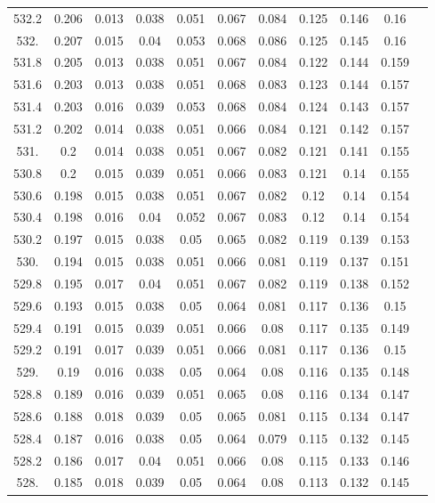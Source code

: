 \documentclass[12pt]{ctexart}
\numberwithin{equation}{section}
\begin{document}
\begin{longtable}{ccccccccccc}
532.2	&	0.206	&	0.013	&	0.038	&	0.051	&	0.067	&	0.084	&	0.125	&	0.146	&	0.16	\\
532.	&	0.207	&	0.015	&	0.04	&	0.053	&	0.068	&	0.086	&	0.125	&	0.145	&	0.16	\\
531.8	&	0.205	&	0.013	&	0.038	&	0.051	&	0.067	&	0.084	&	0.122	&	0.144	&	0.159	\\
531.6	&	0.203	&	0.013	&	0.038	&	0.051	&	0.068	&	0.083	&	0.123	&	0.144	&	0.157	\\
531.4	&	0.203	&	0.016	&	0.039	&	0.053	&	0.068	&	0.084	&	0.124	&	0.143	&	0.157	\\
531.2	&	0.202	&	0.014	&	0.038	&	0.051	&	0.066	&	0.084	&	0.121	&	0.142	&	0.157	\\
531.	&	0.2	&	0.014	&	0.038	&	0.051	&	0.067	&	0.082	&	0.121	&	0.141	&	0.155	\\
530.8	&	0.2	&	0.015	&	0.039	&	0.051	&	0.066	&	0.083	&	0.121	&	0.14	&	0.155	\\
530.6	&	0.198	&	0.015	&	0.038	&	0.051	&	0.067	&	0.082	&	0.12	&	0.14	&	0.154	\\
530.4	&	0.198	&	0.016	&	0.04	&	0.052	&	0.067	&	0.083	&	0.12	&	0.14	&	0.154	\\
530.2	&	0.197	&	0.015	&	0.038	&	0.05	&	0.065	&	0.082	&	0.119	&	0.139	&	0.153	\\
530.	&	0.194	&	0.015	&	0.038	&	0.051	&	0.066	&	0.081	&	0.119	&	0.137	&	0.151	\\
529.8	&	0.195	&	0.017	&	0.04	&	0.051	&	0.067	&	0.082	&	0.119	&	0.138	&	0.152	\\
529.6	&	0.193	&	0.015	&	0.038	&	0.05	&	0.064	&	0.081	&	0.117	&	0.136	&	0.15	\\
529.4	&	0.191	&	0.015	&	0.039	&	0.051	&	0.066	&	0.08	&	0.117	&	0.135	&	0.149	\\
529.2	&	0.191	&	0.017	&	0.039	&	0.051	&	0.066	&	0.081	&	0.117	&	0.136	&	0.15	\\
529.	&	0.19	&	0.016	&	0.038	&	0.05	&	0.064	&	0.08	&	0.116	&	0.135	&	0.148	\\
528.8	&	0.189	&	0.016	&	0.039	&	0.051	&	0.065	&	0.08	&	0.116	&	0.134	&	0.147	\\
528.6	&	0.188	&	0.018	&	0.039	&	0.05	&	0.065	&	0.081	&	0.115	&	0.134	&	0.147	\\
528.4	&	0.187	&	0.016	&	0.038	&	0.05	&	0.064	&	0.079	&	0.115	&	0.132	&	0.145	\\
528.2	&	0.186	&	0.017	&	0.04	&	0.051	&	0.066	&	0.08	&	0.115	&	0.133	&	0.146	\\
528.	&	0.185	&	0.018	&	0.039	&	0.05	&	0.064	&	0.08	&	0.113	&	0.132	&	0.145	\\

\end{longtable}
\end{document}
